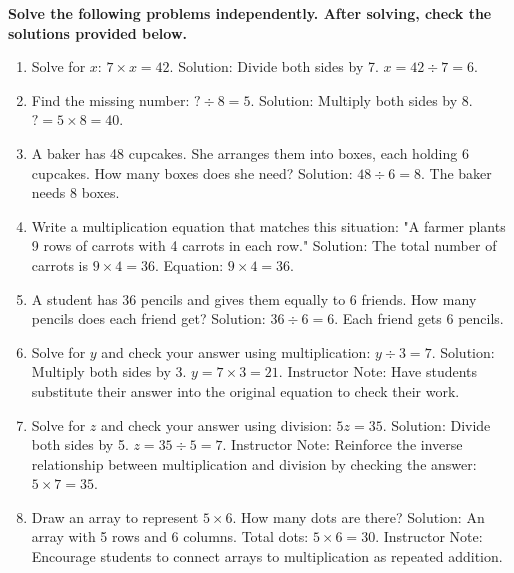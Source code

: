 \documentclass[12pt]{article}
\begin{document}
\begin{tcolorbox}[colframe=black!60, colback=white, 
coltitle=black, colbacktitle=black!15, fonttitle=\bfseries\Large, 
title=Independent Practice, halign title=center, left=10pt, right=10pt, top=10pt, bottom=15pt]
\textbf{Solve the following problems independently. After solving, check the solutions provided below.}
\begin{enumerate}[itemsep=2em] %
    \item Solve for \( x \): \( 7 \times x = 42 \).  
        {\color{red} Solution: Divide both sides by 7. \( x = 42 \div 7 = 6 \).}
    
    \item Find the missing number: \( ? \div 8 = 5 \).  
        {\color{red} Solution: Multiply both sides by 8. \( ? = 5 \times 8 = 40 \).}
    
    \item A baker has 48 cupcakes. She arranges them into boxes, each holding 6 cupcakes. How many boxes does she need?  
        {\color{red} Solution: \( 48 \div 6 = 8 \). The baker needs 8 boxes.}
    
    \item Write a multiplication equation that matches this situation:  
    "A farmer plants 9 rows of carrots with 4 carrots in each row."  
        {\color{red} Solution: The total number of carrots is \( 9 \times 4 = 36 \). Equation: \( 9 \times 4 = 36 \).}
    
    \item A student has 36 pencils and gives them equally to 6 friends. How many pencils does each friend get?  
        {\color{red} Solution: \( 36 \div 6 = 6 \). Each friend gets 6 pencils.}
    
    \item Solve for \( y \) and check your answer using multiplication: \( y \div 3 = 7 \).  
        {\color{red} Solution: Multiply both sides by 3. \( y = 7 \times 3 = 21 \).}  
        {\color{blue} Instructor Note: Have students substitute their answer into the original equation to check their work.}
    
    \item Solve for \( z \) and check your answer using division: \( 5z = 35 \).  
        {\color{red} Solution: Divide both sides by 5. \( z = 35 \div 5 = 7 \).}  
        {\color{blue} Instructor Note: Reinforce the inverse relationship between multiplication and division by checking the answer: \( 5 \times 7 = 35 \).}
    
    \item Draw an array to represent \( 5 \times 6 \). How many dots are there?  
        {\color{red} Solution: An array with 5 rows and 6 columns. Total dots: \( 5 \times 6 = 30 \).}  
        {\color{blue} Instructor Note: Encourage students to connect arrays to multiplication as repeated addition.}
\end{enumerate}
\end{tcolorbox}
\end{document}
